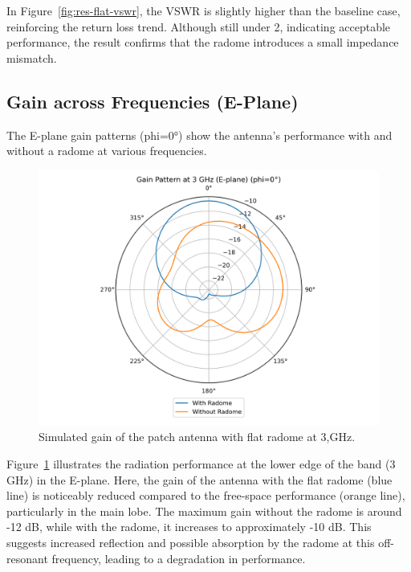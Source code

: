 In Figure~\ref{fig:res-flat-vswr}, the VSWR is slightly higher than the baseline case, reinforcing the return loss trend. Although still under 2, indicating acceptable performance, the result confirms that the radome introduces a small impedance mismatch.

\subsection{Gain across Frequencies (E-Plane)}

The E-plane gain patterns (phi=0°) show the antenna's performance with and without a radome at various frequencies.

\begin{figure}[H]
\centering
\includegraphics[width=1.0\textwidth]{figures/comparison_flat_radome/gainE_3_GHz.png}
\caption{Simulated gain of the patch antenna with flat radome at 3,GHz.}
\label{fig:res-flat-gainE3}
\end{figure}

Figure~\ref{fig:res-flat-gainE3} illustrates the radiation performance at the lower edge of the band (3 GHz) in the E-plane. Here, the gain of the antenna with the flat radome (blue line) is noticeably reduced compared to the free-space performance (orange line), particularly in the main lobe. The maximum gain without the radome is around -12 dB, while with the radome, it increases to approximately -10 dB. This suggests increased reflection and possible absorption by the radome at this off-resonant frequency, leading to a degradation in performance.

